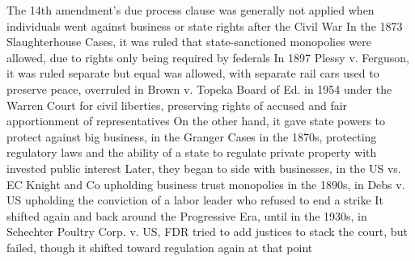 \documentclass[11 pt, twoside]{article}
\newenvironment{outline*}
{
	\begin{outline}[enumerate]
	}
	{\end{outline}
}
\begin{document}
\begin{outline*}
\1 The 14th amendment’s due process clause was generally not applied when individuals went against business or state rights after the Civil War
\2 In the 1873 Slaughterhouse Cases, it was ruled that state-sanctioned monopolies were allowed, due to rights only being required by federals
\2 In 1897 Plessy v. Ferguson, it was ruled separate but equal was allowed, with separate rail cars used to preserve peace, overruled in Brown v. Topeka Board of Ed. in 1954 under the Warren Court for civil liberties, preserving rights of accused and fair apportionment of representatives
\1 On the other hand, it gave state powers to protect against big business, in the Granger Cases in the 1870s, protecting regulatory laws and the ability of a state to regulate private property with invested public interest
\2 Later, they began to side with businesses, in the US vs. EC Knight and Co upholding business trust monopolies in the 1890s, in Debs v. US upholding the conviction of a labor leader who refused to end a strike
\2 It shifted again and back around the Progressive Era, until in the 1930s, in Schechter Poultry Corp. v. US, FDR tried to add justices to stack the court, but failed, though it shifted toward regulation again at that point
\end{outline*}
\end{document}
